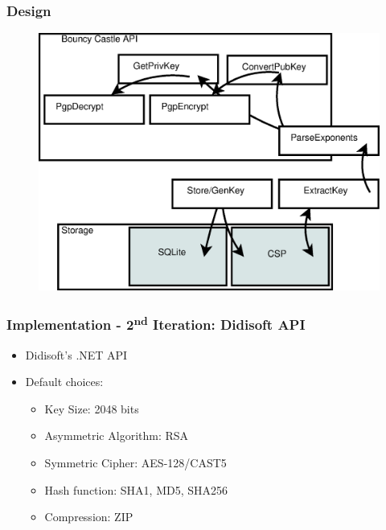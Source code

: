 \documentclass{beamer}
\begin{document}
\begin{frame}
\frametitle{Design}

\begin{figure}
\includegraphics[scale=0.4]{Diagram1}
\end{figure}

\end{frame}


\begin{frame}
\frametitle{Implementation - 2\textsuperscript{nd} Iteration: Didisoft API}

\begin{itemize}
\item Didisoft's .NET API
\item Default choices: 
\begin{itemize}
\item Key Size: 2048 bits \cite{p1}
\item Asymmetric Algorithm: RSA
\item Symmetric Cipher: AES-128/CAST5
\item Hash function: SHA1, MD5, SHA256
\item Compression: ZIP
\end{itemize}
\end{itemize}

\end{frame}

\end{document}
